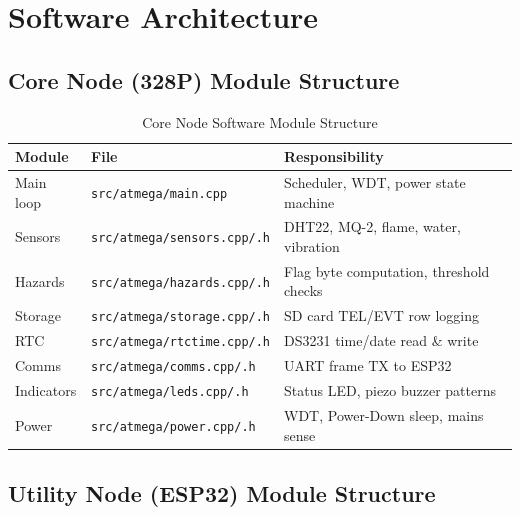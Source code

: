 \documentclass[12pt,a4paper]{article}
\begin{document}
\section{Software Architecture}

\subsection{Core Node (328P) Module Structure}

\begin{table}[H]
\centering
\begin{tabular}{@{} L{2.4cm} L{5cm} L{5cm} @{}}
\toprule
\textbf{Module}  & \textbf{File}                        & \textbf{Responsibility}                    \\
\midrule
Main loop        & \texttt{src/atmega/main.cpp}          & Scheduler, WDT, power state machine        \\
Sensors          & \texttt{src/atmega/sensors.cpp/.h}    & DHT22, MQ-2, flame, water, vibration       \\
Hazards          & \texttt{src/atmega/hazards.cpp/.h}    & Flag byte computation, threshold checks    \\
Storage          & \texttt{src/atmega/storage.cpp/.h}    & SD card TEL/EVT row logging                \\
RTC              & \texttt{src/atmega/rtctime.cpp/.h}    & DS3231 time/date read \& write             \\
Comms            & \texttt{src/atmega/comms.cpp/.h}      & UART frame TX to ESP32                     \\
Indicators       & \texttt{src/atmega/leds.cpp/.h}       & Status LED, piezo buzzer patterns          \\
Power            & \texttt{src/atmega/power.cpp/.h}      & WDT, Power-Down sleep, mains sense         \\
\bottomrule
\end{tabular}
\caption{Core Node Software Module Structure}
\end{table}

\subsection{Utility Node (ESP32) Module Structure}
\end{document}

